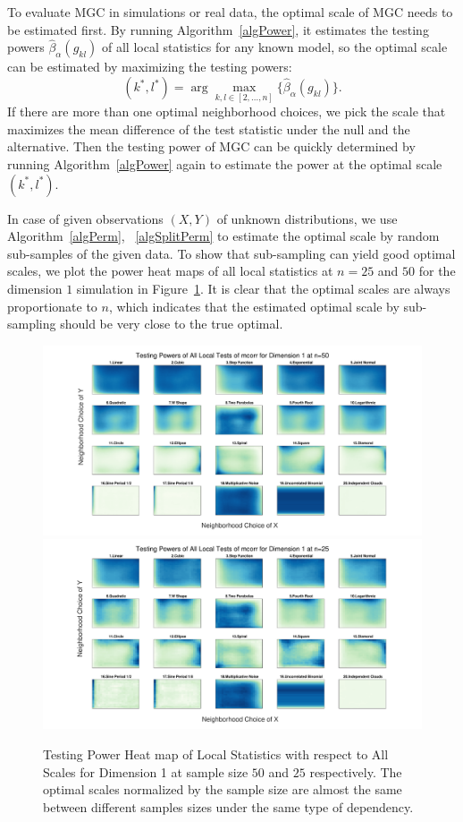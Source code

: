 \documentclass[11pt]{article}
\begin{document}
To evaluate MGC in simulations or real data, the optimal scale of MGC needs to be estimated first. By running Algorithm~\ref{algPower}, it estimates the testing powers $\hat{\beta}_{\alpha}(g_{kl})$ of all local statistics for any known model, so the optimal scale can be estimated by maximizing the testing powers:
\begin{equation}
\label{power}
(k^{*},l^{*})=\arg\max_{k,l \in [2,\ldots,n] }\{\hat{\beta}_{\alpha}(g_{kl})\}.
\end{equation}
If there are more than one optimal neighborhood choices, we pick the scale that maximizes the mean difference of the test statistic under the null and the alternative. Then the testing power of MGC can be quickly determined by running Algorithm~\ref{algPower} again to estimate the power at the optimal scale $(k^{*},l^{*})$. 

In case of given observations $(X,Y)$ of unknown distributions, we use Algorithm~\ref{algPerm}, ~\ref{algSplitPerm} to estimate the optimal scale by random sub-samples of the given data. To show that sub-sampling can yield good optimal scales, we plot the power heat maps of all local statistics at $n=25$ and $50$ for the dimension $1$ simulation in Figure~\ref{figSim2a}. It is clear that the optimal scales are always proportionate to $n$, which indicates that the estimated optimal scale by sub-sampling should be very close to the true optimal. 

\begin{figure}[htbp]
\includegraphics[width=1.0\textwidth]{../Figures/Fig2b}
\includegraphics[width=1.0\textwidth]{../Figures/Fig2c}
\caption{Testing Power Heat map of Local Statistics with respect to All Scales for Dimension 1 at sample size $50$ and $25$ respectively. The optimal scales normalized by the sample size are almost the same between different samples sizes under the same type of dependency. }
\label{figSim2a}
\end{figure}
\end{document}
